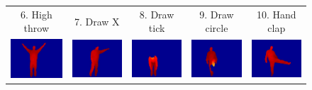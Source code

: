 \documentclass[final,3p,times,twocolumn]{elsarticle}
\begin{document}
\begin{figure}[ht]
{\begin{tabular}{ccccc}
		         6. High throw &          7. Draw X &          8. Draw tick &           9. Draw circle &          10. Hand clap\\
		
		         \includegraphics[width=0.4\columnwidth]{Figures/MSRAction3D_twohandwave.pdf} &          \includegraphics[width=0.4\columnwidth]{Figures/MSRAction3D_sideboxing.pdf} &          \includegraphics[width=0.4\columnwidth]{Figures/MSRAction3D_bend.pdf} &          \includegraphics[width=0.4\columnwidth]{Figures/MSRAction3D_forwardkick.pdf} &          \includegraphics[width=0.4\columnwidth]{Figures/MSRAction3D_sidekick.pdf} \\
		

\end{tabular}}
\end{figure}
\end{document}
